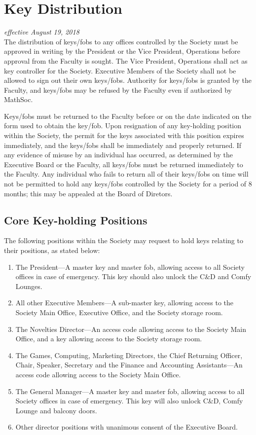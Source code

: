 \section{Key Distribution}
\emph{effective August 19, 2018}\\

The distribution of keys/fobs to any offices controlled by the Society must be
approved in writing by the President or the Vice President, Operations before
approval from the Faculty is sought. The Vice President, Operations shall act
as key controller for the Society. Executive Members of the Society shall not
be allowed to sign out their own keys/fobs. Authority for keys/fobs is granted
by the Faculty, and keys/fobs may be refused by the Faculty even if authorized
by MathSoc.

Keys/fobs must be returned to the Faculty before or on the date indicated on
the form used to obtain the key/fob. Upon resignation of any key-holding
position within the Society, the permit for the keys associated with this
position expires immediately, and the keys/fobs shall be immediately and
properly returned. If any evidence of misuse by an individual has occurred, as
determined by the Executive Board or the Faculty, all keys/fobs must be
returned immediately to the Faculty. Any individual who fails to return all of
their keys/fobs on time will not be permitted to hold any keys/fobs controlled
by the Society for a period of 8 months; this may be appealed at the Board of 
Diretors.

\subsection{Core Key-holding Positions}
The following positions within the Society may request to hold keys relating to
their positions, as stated below:
\begin{enumerate}
    \item The President---A master key and master fob, allowing access to all
        Society offices in case of emergency. This key should also unlock the C\&D
        and Comfy Lounges.
    \item All other Executive Members---A sub-master key, allowing access to the
        Society Main Office, Executive Office, and the Society storage room.
    \item The Novelties Director---An access code allowing access to the Society Main
        Office, and a key allowing access to the Society storage room.
    \item The Games, Computing, Marketing Directors, the Chief Returning Officer, Chair,
        Speaker, Secretary and the Finance and Accounting Assistants---An access code
        allowing access to the Society Main Office.
    \item The General Manager---A master key and master fob, allowing access to all
        Society offices in case of emergency. This key will also unlock C\&D, Comfy Lounge
        and balcony doors. 
    \item Other director positions with unanimous consent of the
        Executive Board.
\end{enumerate}

